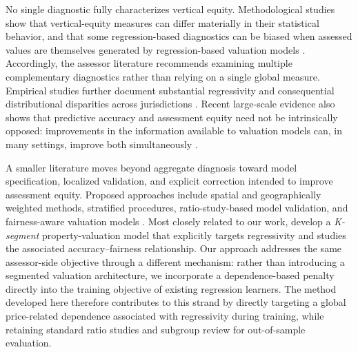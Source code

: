 \documentclass[10pt]{article}
\theoremstyle{definition}
\newcommand{\1}{\mathbf{1}}
\begin{document}
{No single diagnostic fully characterizes vertical equity. Methodological studies show that vertical-equity measures can differ materially in their statistical behavior, and that some regression-based diagnostics can be biased when assessed values are themselves generated by regression-based valuation models} \cite{IAAO2023VerticalReview,McMillenSingh2023}. {Accordingly, the assessor literature recommends examining multiple complementary diagnostics rather than relying on a single global measure.}  {Empirical studies further document substantial regressivity and consequential distributional disparities across jurisdictions} \cite{Berry2021,AvenancioLeonHoward2022}. {Recent large-scale evidence also shows that predictive accuracy and assessment equity need not be intrinsically opposed: improvements in the information available to valuation models can, in many settings, improve both simultaneously \cite{SmithEtAl2026}.}

{A smaller literature moves beyond aggregate diagnosis toward model specification, localized validation, and explicit correction intended to improve assessment equity.} Proposed approaches include spatial and geographically weighted methods, stratified procedures, ratio-study-based model validation, and fairness-aware valuation models \cite{Quintos2014,BidansetEtAl2019,BidansetEtAl2025,HermansEtAl2022,HermansEtAl2025,CandoganHanLu2023} . {Most closely related to our work, \textcite{CandoganHanLu2023} develop a \emph{K-segment} property-valuation model that explicitly targets regressivity and studies the associated accuracy--fairness relationship. Our approach addresses the same assessor-side objective through a different mechanism: rather than introducing a segmented valuation architecture, we incorporate a dependence-based penalty directly into the training objective of existing regression learners.} {The method developed here therefore contributes to this strand by directly targeting a global price-related dependence associated with regressivity during training, while retaining standard ratio studies and subgroup review for out-of-sample evaluation.}
\end{document}
